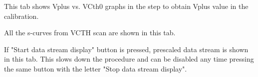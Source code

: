 \documentclass[11pt,a4paper]{article}
\begin{document}
\begin{description}[style=nextline]
	\item[Vplus vs. VCth0 Graphs]
	This tab shows Vplus vs. VCth0 graphs in the step to obtain Vplus value in the calibration. 

	\item[Scurve Histograms]
	All the s-curves from VCTH scan are shown in this tab.

	\item[Data]
	If "Start data stream display" button is pressed, prescaled data stream is shown in this tab.  This slows down the procedure and can be disabled
	any time pressing the same button with the letter "Stop data stream display".

	\end{description}

	
	
	
\end{document}
